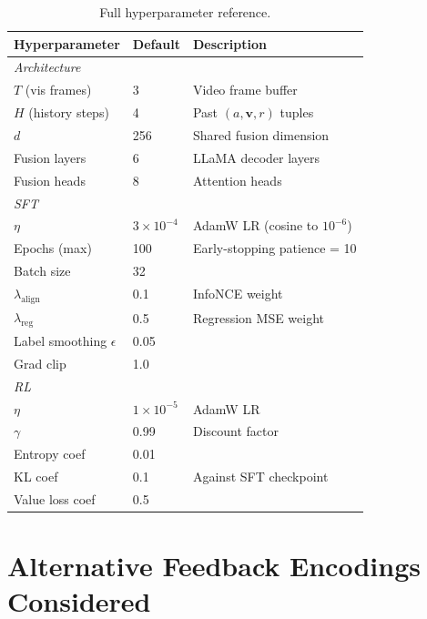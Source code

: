 \documentclass{article}
\begin{document}
\begin{table}[h]
\centering
\caption{Full hyperparameter reference.}
\label{tab:hparams}
\small
\begin{tabular}{lll}
\toprule
\textbf{Hyperparameter} & \textbf{Default} & \textbf{Description} \\
\midrule
\multicolumn{3}{l}{\textit{Architecture}} \\
$T$ (vis frames)        & 3     & Video frame buffer \\
$H$ (history steps)     & 4     & Past $(a,\mathbf{v},r)$ tuples \\
$d$                     & 256   & Shared fusion dimension \\
Fusion layers           & 6     & LLaMA decoder layers \\
Fusion heads            & 8     & Attention heads \\
\midrule
\multicolumn{3}{l}{\textit{SFT}} \\
$\eta$                  & $3\!\times\!10^{-4}$ & AdamW LR (cosine to $10^{-6}$) \\
Epochs (max)            & 100   & Early-stopping patience = 10 \\
Batch size              & 32    & \\
$\lambda_\mathrm{align}$& 0.1   & InfoNCE weight \\
$\lambda_\mathrm{reg}$  & 0.5   & Regression MSE weight \\
Label smoothing $\epsilon$ & 0.05 & \\
Grad clip               & 1.0   & \\
\midrule
\multicolumn{3}{l}{\textit{RL}} \\
$\eta$                  & $1\!\times\!10^{-5}$ & AdamW LR \\
$\gamma$                & 0.99  & Discount factor \\
Entropy coef            & 0.01  & \\
KL coef                 & 0.1   & Against SFT checkpoint \\
Value loss coef         & 0.5   & \\
\bottomrule
\end{tabular}
\end{table}

\section{Alternative Feedback Encodings Considered}
\label{app:alternatives}
\end{document}
